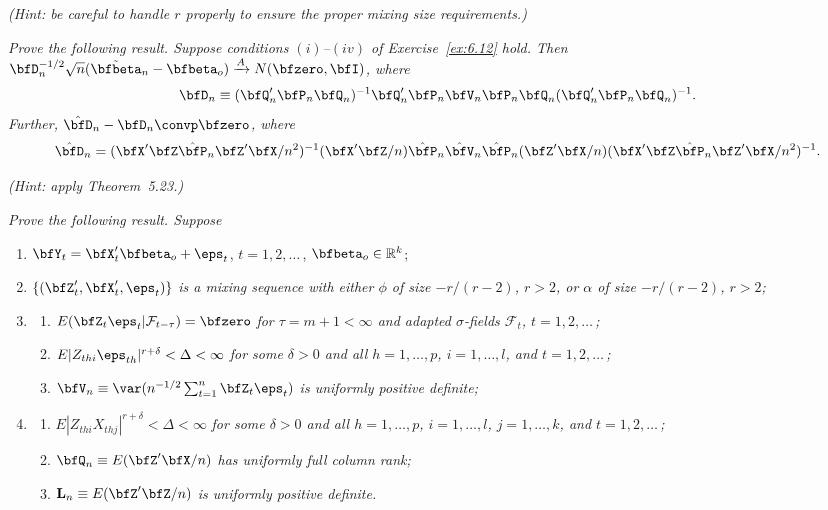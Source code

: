 \begin{exercises}
\textit{(Hint: be careful to handle $r$ properly to ensure the proper mixing size requirements.)}

\item\label{ex:6.13} \textit{Prove the following result. Suppose conditions $(i)$--$(iv)$ of Exercise~\ref{ex:6.12} hold. Then $\bfD_n^{-1/2}\sqrt{n}(\tilde{\bfbeta}_n - \bfbeta_o) \xrightarrow{A} N(\bfzero,\bfI)$, where}
\[
  \bfD_n \equiv (\bfQ_n'\bfP_n\bfQ_n)^{-1}\bfQ_n'\bfP_n\bfV_n\bfP_n\bfQ_n(\bfQ_n'\bfP_n\bfQ_n)^{-1}.
\]
\textit{Further, $\hat{\bfD}_n - \bfD_n \convp \bfzero$, where}
\[
  \hat{\bfD}_n = (\bfX'\bfZ\hat{\bfP}_n\bfZ'\bfX/n^2)^{-1}(\bfX'\bfZ/n)\hat{\bfP}_n\hat{\bfV}_n\hat{\bfP}_n(\bfZ'\bfX/n)(\bfX'\bfZ\hat{\bfP}_n\bfZ'\bfX/n^2)^{-1}.
\]

\textit{(Hint: apply Theorem~5.23.)}

\item\label{ex:6.14} \textit{Prove the following result. Suppose}
\begin{enumerate}[label=(\roman*)]
  \item $\bfY_t = \bfX_t'\bfbeta_o + \eps_t$, \quad $t = 1,2,\ldots$\,, \quad $\bfbeta_o \in \mathbb{R}^k$;
  \item $\{(\bfZ_t',\bfX_t',\eps_t)\}$ \textit{is a mixing sequence with either $\phi$ of size $-r/(r-2)$, $r>2$, or $\alpha$ of size $-r/(r-2)$, $r>2$;}
  \item\begin{enumerate}[label=(\alph*)]
    \item $E(\bfZ_t\eps_t|\mathcal{F}_{t-\tau}) = \bfzero$ \textit{for $\tau = m+1 < \infty$ and adapted $\sigma$-fields $\mathcal{F}_t$, $t = 1,2,\ldots$\,;}
    \item $E|Z_{thi}\eps_{th}|^{r+\delta} < \Delta < \infty$ \textit{for some $\delta > 0$ and all $h = 1,\ldots,p$, $i = 1,\ldots,l$, and $t = 1,2,\ldots$\,;}
    \item $\bfV_n \equiv \var(n^{-1/2}\sum_{t=1}^{n}\bfZ_t\eps_t)$ \textit{is uniformly positive definite;}
  \end{enumerate}
  \item\begin{enumerate}[label=(\alph*)]
    \item $E|Z_{thi}X_{thj}|^{r+\delta} < \Delta < \infty$ \textit{for some $\delta > 0$ and all $h = 1,\ldots,p$, $i = 1,\ldots,l$, $j = 1,\ldots,k$, and $t = 1,2,\ldots$\,;}
    \item $\bfQ_n \equiv E(\bfZ'\bfX/n)$ \textit{has uniformly full column rank;}
    \item $\mathbf{L}_n \equiv E(\bfZ'\bfZ/n)$ \textit{is uniformly positive definite.}

\end{enumerate}
\end{enumerate}
\end{exercises}
